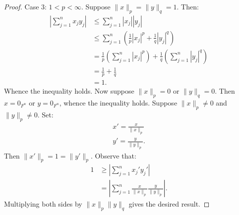\begin{proof}
            Case 3: $1 < p < \infty$. Suppose $\lVert x \rVert _p = \lVert y \rVert _q =1 $. Then:
                \begin{equation*}
                \begin{split}
                    \left|\sum_{j = 1}^n x_j y_j\right|
                    & \leq \sum_{j = 1}^n |x_j||y_j| \\
                    & \leq \sum_{j =1}^n \left(\frac{1}{p}|x_j|^p + \frac{1}{q}|y_j|^q\right) \\
                    & = \frac{1}{p} \left(\sum_{j = 1}^n |x_j|^p\right) + \frac{1}{q} \left(\sum_{j = 1}^n|y_j|^q\right) \\
                    & = \frac{1}{p} + \frac{1}{q} \\
                    & = 1.
                \end{split}
                \end{equation*}
            Whence the inequality holds. Now suppose $\lVert x \rVert _p = 0$ or $\lVert y \rVert _q = 0$. Then $x = 0_{F^n}$ or $y = 0_{F^n}$, whence the inequality holds. Suppose $\lVert x \rVert _p \neq 0$ and $\lVert y \rVert _p \neq 0$. Set:
                \begin{equation*}
                \begin{split}
                    x' = \frac{x}{\lVert x \rVert _p} \\
                    y' = \frac{y}{ \lVert y \rVert _p}.
                \end{split}
                \end{equation*}
            Then $\lVert x' \rVert _p = 1 = \lVert y' \rVert _p$. Observe that:
                \begin{equation*}
                \begin{split}
                    1 &\geq \left|\sum_{j = 1}^n x_j' y_j'\right| \\
                    & = \left|\sum_{j = 1}^n \frac{x}{\lVert x \rVert _p}\frac{y}{ \lVert y \rVert _p}\right|.
                \end{split}
                \end{equation*}
            Multiplying both sides by $\lVert x \rVert _p \lVert y \rVert _q$ gives the desired result.
        \end{proof}

